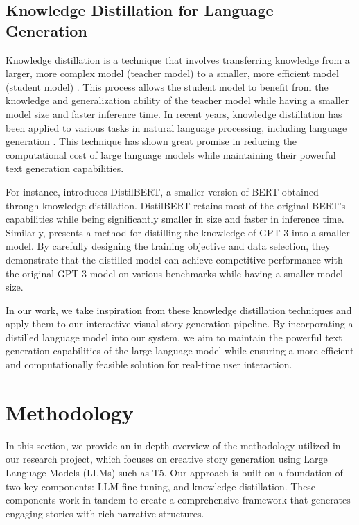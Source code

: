 \documentclass{article} %
\begin{document}
\subsection{Knowledge Distillation for Language Generation}
Knowledge distillation is a technique that involves transferring knowledge from a larger, more complex model (teacher model) to a smaller, more efficient model (student model) \cite{Huang_2021_CVPR}. This process allows the student model to benefit from the knowledge and generalization ability of the teacher model while having a smaller model size and faster inference time. In recent years, knowledge distillation has been applied to various tasks in natural language processing, including language generation \cite{kim2016sequencelevel, 10.1145/1150402.1150464}. This technique has shown great promise in reducing the computational cost of large language models while maintaining their powerful text generation capabilities. 

For instance, \cite{Sanh2020DistilBERTAD} introduces DistilBERT, a smaller version of BERT \cite{devlin2018bert} obtained through knowledge distillation. DistilBERT retains most of the original BERT's capabilities while being significantly smaller in size and faster in inference time. Similarly, \cite{tang-etal-2019-natural} presents a method for distilling the knowledge of GPT-3 into a smaller model. By carefully designing the training objective and data selection, they demonstrate that the distilled model can achieve competitive performance with the original GPT-3 model on various benchmarks while having a smaller model size. 

In our work, we take inspiration from these knowledge distillation techniques and apply them to our interactive visual story generation pipeline. By incorporating a distilled language model into our system, we aim to maintain the powerful text generation capabilities of the large language model while ensuring a more efficient and computationally feasible solution for real-time user interaction.


\section{Methodology}
In this section, we provide an in-depth overview of the methodology utilized in our research project, which focuses on creative story generation using Large Language Models (LLMs) such as T5. Our approach is built on a foundation of two key components: LLM fine-tuning, and knowledge distillation. These components work in tandem to create a comprehensive framework that generates engaging stories with rich narrative structures.
\end{document}
